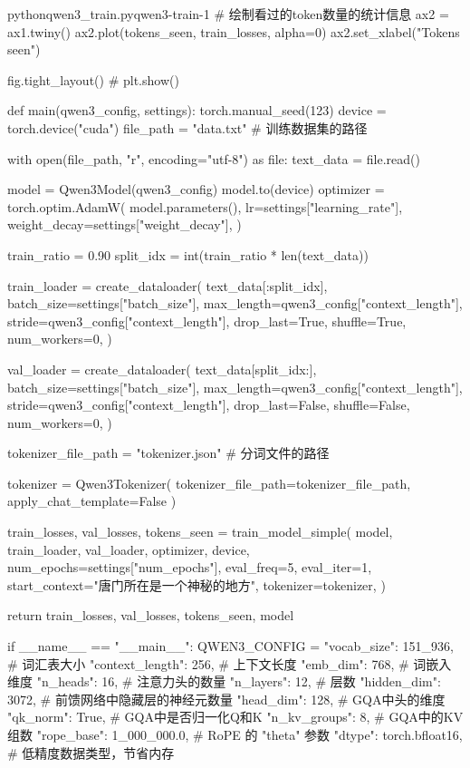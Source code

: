 \documentclass[lang=cn,newtx,10pt,scheme=chinese]{elegantbook}
\begin{document}
\begin{codebox}{python}{qwen3\_train.py}{qwen3-train-1}
    # 绘制看过的token数量的统计信息
    ax2 = ax1.twiny()
    ax2.plot(tokens_seen, train_losses, alpha=0)
    ax2.set_xlabel("Tokens seen")

    fig.tight_layout()
    # plt.show()

def main(qwen3_config, settings):
    torch.manual_seed(123)
    device = torch.device("cuda")
    file_path = "data.txt" # 训练数据集的路径

    with open(file_path, "r", encoding="utf-8") as file:
        text_data = file.read()

    model = Qwen3Model(qwen3_config)
    model.to(device)
    optimizer = torch.optim.AdamW(
        model.parameters(),
        lr=settings["learning_rate"],
        weight_decay=settings["weight_decay"],
    )

    train_ratio = 0.90
    split_idx = int(train_ratio * len(text_data))

    train_loader = create_dataloader(
        text_data[:split_idx],
        batch_size=settings["batch_size"],
        max_length=qwen3_config["context_length"],
        stride=qwen3_config["context_length"],
        drop_last=True,
        shuffle=True,
        num_workers=0,
    )

    val_loader = create_dataloader(
        text_data[split_idx:],
        batch_size=settings["batch_size"],
        max_length=qwen3_config["context_length"],
        stride=qwen3_config["context_length"],
        drop_last=False,
        shuffle=False,
        num_workers=0,
    )

    tokenizer_file_path = "tokenizer.json" # 分词文件的路径

    tokenizer = Qwen3Tokenizer(
        tokenizer_file_path=tokenizer_file_path, apply_chat_template=False
    )

    train_losses, val_losses, tokens_seen = train_model_simple(
        model,
        train_loader,
        val_loader,
        optimizer,
        device,
        num_epochs=settings["num_epochs"],
        eval_freq=5,
        eval_iter=1,
        start_context="唐门所在是一个神秘的地方",
        tokenizer=tokenizer,
    )

    return train_losses, val_losses, tokens_seen, model

if __name__ == "__main__":
    QWEN3_CONFIG = {
        "vocab_size": 151_936,  # 词汇表大小
        "context_length": 256,  # 上下文长度
        "emb_dim": 768,  # 词嵌入维度
        "n_heads": 16,  # 注意力头的数量
        "n_layers": 12,  # 层数
        "hidden_dim": 3072,  # 前馈网络中隐藏层的神经元数量
        "head_dim": 128,  # GQA中头的维度
        "qk_norm": True,  # GQA中是否归一化Q和K
        "n_kv_groups": 8,  # GQA中的KV组数
        "rope_base": 1_000_000.0,  # RoPE 的 "theta" 参数
        "dtype": torch.bfloat16,  # 低精度数据类型，节省内存
    }


\end{codebox}
\end{document}

